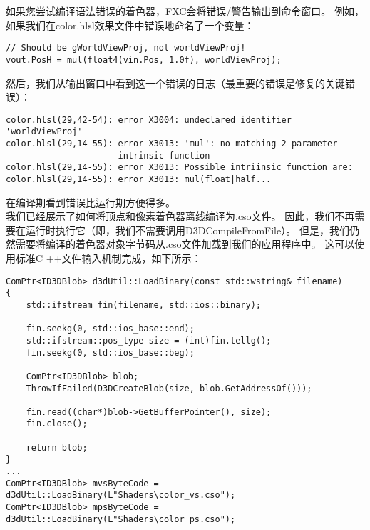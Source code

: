 \begin{flushleft}
\begin{tabular}{|p{5em}|p{35em}|}
\hline
\end{tabular}
如果您尝试编译语法错误的着色器，FXC会将错误/警告输出到命令窗口。 例如，如果我们在color.hlsl效果文件中错误地命名了一个变量：\\
\begin{lstlisting}
// Should be gWorldViewProj, not worldViewProj!
vout.PosH = mul(float4(vin.Pos, 1.0f), worldViewProj);
\end{lstlisting}
然后，我们从输出窗口中看到这一个错误的日志（最重要的错误是修复的关键错误）：\\
\begin{lstlisting}
color.hlsl(29,42-54): error X3004: undeclared identifier 'worldViewProj'
color.hlsl(29,14-55): error X3013: 'mul': no matching 2 parameter 
                      intrinsic function
color.hlsl(29,14-55): error X3013: Possible intriinsic function are:
color.hlsl(29,14-55): error X3013: mul(float|half...
\end{lstlisting}
在编译期看到错误比运行期方便得多。\\
我们已经展示了如何将顶点和像素着色器离线编译为.cso文件。 因此，我们不再需要在运行时执行它（即，我们不需要调用D3DCompileFromFile）。 但是，我们仍然需要将编译的着色器对象字节码从.cso文件加载到我们的应用程序中。 这可以使用标准C ++文件输入机制完成，如下所示：\\
\begin{lstlisting}
ComPtr<ID3DBlob> d3dUtil::LoadBinary(const std::wstring& filename)
{
    std::ifstream fin(filename, std::ios::binary);
    
    fin.seekg(0, std::ios_base::end);
    std::ifstream::pos_type size = (int)fin.tellg();
    fin.seekg(0, std::ios_base::beg);
    
    ComPtr<ID3DBlob> blob;
    ThrowIfFailed(D3DCreateBlob(size, blob.GetAddressOf()));
    
    fin.read((char*)blob->GetBufferPointer(), size);
    fin.close();

    return blob;
}
...
ComPtr<ID3DBlob> mvsByteCode = d3dUtil::LoadBinary(L"Shaders\color_vs.cso");
ComPtr<ID3DBlob> mpsByteCode = d3dUtil::LoadBinary(L"Shaders\color_ps.cso");
\end{lstlisting}
\end{flushleft}

